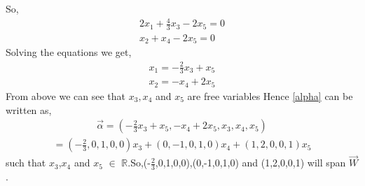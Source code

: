 \documentclass[journal,12pt,twocolumn]{IEEEtran}
\begin{document}
So,
\begin{align}
2x_1+\frac{4}{3}x_3-2x_5=0\\
x_2+x_4-2x_5=0
\end{align}
Solving the equations we get,
\begin{align}
x_1=-\frac{2}{3}x_3+x_5\\
x_2=-x_4+2x_5
\end{align}
From above we can see that $x_3,x_4$ and $x_5$ are free variables
   Hence \eqref{alpha} can be written as,
   \begin{align}
   \vec{\alpha}=(-\frac{2}{3}x_3+x_5,-x_4+2x_5,x_3,x_4,x_5)\end{align}
   \begin{align}
   =(-\frac{2}{3},0,1,0,0)x_3+(0,-1,0,1,0)x_4+(1,2,0,0,1)x_5
   \end{align}
   such that $x_3$,$x_4$ and $x_5$ $\in$ $\mathbb{R}$.So,(-$\frac{2}{3}$,0,1,0,0),(0,-1,0,1,0) and (1,2,0,0,1) will span $\vec{W}$.
   
\end{document}
